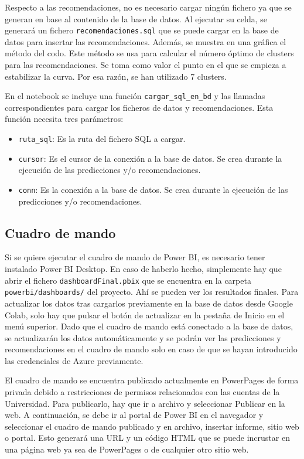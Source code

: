 Respecto a las recomendaciones, no es necesario cargar ningún fichero ya que se generan en base al contenido de la base de datos. 
Al ejecutar su celda, se generará un fichero \texttt{recomendaciones.sql} que se puede cargar en la base de datos para insertar las recomendaciones.
Además, se muestra en una gráfica el método del codo. Este método se usa para calcular el número óptimo de clusters para las recomendaciones.
Se toma como valor el punto en el que se empieza a estabilizar la curva. Por esa razón, se han utilizado 7 clusters.


En el notebook se incluye una función \texttt{cargar\_sql\_en\_bd} y las llamadas correspondientes para cargar los ficheros de datos y recomendaciones.
Esta función necesita tres parámetros:
\begin{itemize}
    \item \texttt{ruta\_sql}: Es la ruta del fichero SQL a cargar.
    \item \texttt{cursor}: Es el cursor de la conexión a la base de datos. Se crea durante la ejecución de las predicciones y/o recomendaciones.
    \item \texttt{conn}: Es la conexión a la base de datos. Se crea durante la ejecución de las predicciones y/o recomendaciones.
\end{itemize}   

\subsection{Cuadro de mando}

Si se quiere ejecutar el cuadro de mando de Power BI, es necesario tener instalado Power BI Desktop.
En caso de haberlo hecho, simplemente hay que abrir el fichero \texttt{dashboardFinal.pbix} que se encuentra en la carpeta \texttt{powerbi/dashboards/} del proyecto.
Ahí se pueden ver los resultados finales. Para actualizar los datos tras cargarlos previamente en la base de datos desde Google Colab, solo hay que pulsar el botón de actualizar en la pestaña de Inicio en el menú superior.
Dado que el cuadro de mando está conectado a la base de datos, se actualizarán los datos automáticamente y se podrán ver las predicciones y recomendaciones en el cuadro de mando solo en caso de que se hayan introducido las credenciales de Azure previamente.


El cuadro de mando se encuentra publicado actualmente en PowerPages de forma privada debido a restricciones de permisos relacionados con las cuentas de la Universidad.
Para publicarlo, hay que ir a archivo y seleccionar Publicar en la web. 
A continuación, se debe ir al portal de Power BI en el navegador y seleccionar el cuadro de mando publicado y en archivo, insertar informe, sitio web o portal.
Esto generará una URL y un código HTML que se puede incrustar en una página web ya sea de PowerPages o de cualquier otro sitio web. 

